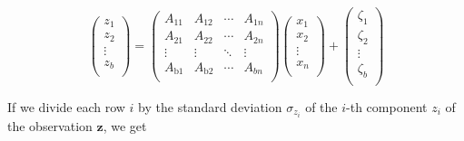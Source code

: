 \documentclass[10pt,oneside,x11names]{article}
\begin{document}
\begin{equation*}
\left(
\begin{array}{c}
 z_1 \\
 z_2 \\
 \vdots  \\
 z_b \\
\end{array}
\right)=\left(
\begin{array}{cccc}
 A_{11} & A_{12} & \cdots  & A_{1 n} \\
 A_{21} & A_{22} & \cdots  & A_{2 n} \\
 \vdots  & \vdots  & \ddots & \vdots  \\
 A_{\text{b1}} & A_{\text{b2}} & \cdots  & A_{b n} \\
\end{array}
\right) \left(
\begin{array}{c}
 x_1 \\
 x_2 \\
 \vdots  \\
 x_n \\
\end{array}
\right)+\left(
\begin{array}{c}
 \zeta _1 \\
 \zeta _2 \\
 \vdots  \\
 \zeta _b \\
\end{array}
\right)
\end{equation*}

If we divide each row \(i\) by the standard deviation \(\sigma_{z_i}\) of the \mbox{$i$-th}
component \(z_i\) of the observation \(\mathbold{z}\), we get
\end{document}

